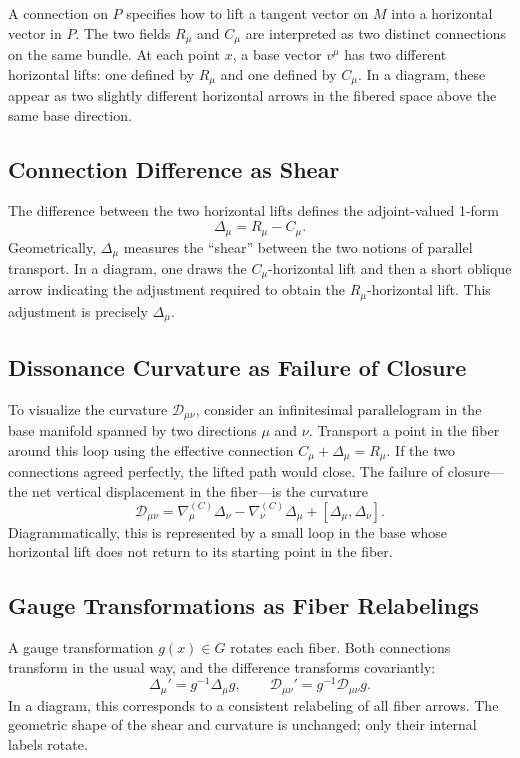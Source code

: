 \documentclass[12pt,openany]{book}
\theoremstyle{plain}
\theoremstyle{definition}
\theoremstyle{remark}
\begin{document}
A connection on $P$ specifies how to lift a tangent vector on $M$ into a
horizontal vector in $P$. The two fields $R_\mu$ and $C_\mu$ are interpreted
as two distinct connections on the same bundle. At each point $x$, a base
vector $v^\mu$ has two different horizontal lifts: one defined by $R_\mu$
and one defined by $C_\mu$. In a diagram, these appear as two slightly
different horizontal arrows in the fibered space above the same base
direction.

\subsection*{Connection Difference as Shear}

The difference between the two horizontal lifts defines the adjoint-valued
1-form
\[
\Delta_\mu = R_\mu - C_\mu.
\]
Geometrically, $\Delta_\mu$ measures the ``shear'' between the two notions
of parallel transport. In a diagram, one draws the $C_\mu$-horizontal lift
and then a short oblique arrow indicating the adjustment required to obtain
the $R_\mu$-horizontal lift. This adjustment is precisely $\Delta_\mu$.

\subsection*{Dissonance Curvature as Failure of Closure}

To visualize the curvature $\mathcal{D}_{\mu\nu}$, consider an infinitesimal
parallelogram in the base manifold spanned by two directions $\mu$ and
$\nu$. Transport a point in the fiber around this loop using the effective
connection $C_\mu + \Delta_\mu = R_\mu$. If the two connections agreed
perfectly, the lifted path would close. The failure of closure---the net
vertical displacement in the fiber---is the curvature
\[
\mathcal{D}_{\mu\nu}
= \nabla_\mu^{(C)} \Delta_\nu
- \nabla_\nu^{(C)} \Delta_\mu
+ [\Delta_\mu, \Delta_\nu].
\]
Diagrammatically, this is represented by a small loop in the base whose
horizontal lift does not return to its starting point in the fiber.

\subsection*{Gauge Transformations as Fiber Relabelings}

A gauge transformation $g(x) \in G$ rotates each fiber. Both connections
transform in the usual way, and the difference transforms covariantly:
\[
\Delta_\mu' = g^{-1} \Delta_\mu g,
\qquad
\mathcal{D}_{\mu\nu}' = g^{-1} \mathcal{D}_{\mu\nu} g.
\]
In a diagram, this corresponds to a consistent relabeling of all fiber
arrows. The geometric shape of the shear and curvature is unchanged; only
their internal labels rotate.
\end{document}

